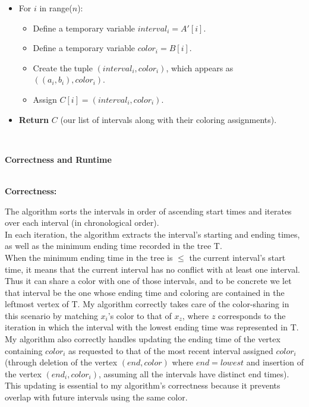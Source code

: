 \documentclass[11pt]{article}
\begin{document}
\begin{enumerate}
\begin{enumerate}
\begin{itemize}
    \item For $i$ in range($n$):
        \begin{itemize}
            \item Define a temporary variable $interval_i = A'[i]$. 
            \item Define a temporary variable $color_i = B[i]$.
            \item Create the tuple $(interval_i, color_i)$, which appears as $((a_i, b_i), color_i)$.
            \item Assign $C[i] = (interval_i, color_i)$.
        \end{itemize}
    \item \textbf{Return} $C$ (our list of intervals along with their coloring assignments).
\end{itemize} \\

\begin{center}
    \Large \textbf{Correctness and Runtime}
\end{center} \\

\textbf{Correctness:} 

The algorithm sorts the intervals in order of ascending start times and iterates over each interval (in chronological order). \\

In each iteration, the algorithm extracts the interval's starting and ending times, as well as the minimum ending time recorded in the tree T. \\

When the minimum ending time in the tree is $\leq$ the current interval's start time, it means that the current interval has no conflict with at least one interval. Thus it can share a color with one of those intervals, and to be concrete we let that interval be the one whose ending time and coloring are contained in the leftmost vertex of T. My algorithm correctly takes care of the color-sharing in this scenario by matching $x_i$'s color to that of $x_z$, where $z$ corresponds to the iteration in which the interval with the lowest ending time was represented in T. My algorithm also correctly handles updating the ending time of the vertex containing $color_i$ as requested to that of the most recent interval assigned $color_i$ (through deletion of the vertex $(end,color)$ where $end = lowest$ and insertion of the vertex $(end_i, color_i)$, assuming all the intervals have distinct end times). This updating is essential to my algorithm's correctness because it prevents overlap with future intervals using the same color. \\


\end{enumerate}
\end{enumerate}
\end{document}
